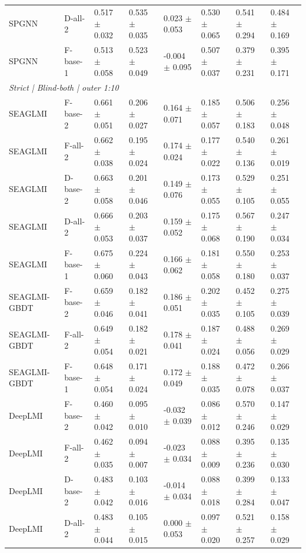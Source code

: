 \begin{landscape}
{\begin{longtable}{llllllll}
SPGNN & D-all-2 & 0.517 $\pm$ 0.032 & 0.535 $\pm$ 0.035 & 0.023 $\pm$ 0.053 & 0.530 $\pm$ 0.065 & 0.541 $\pm$ 0.294 & 0.484 $\pm$ 0.169 \\
SPGNN & F-base-1 & 0.513 $\pm$ 0.058 & 0.523 $\pm$ 0.049 & -0.004 $\pm$ 0.095 & 0.507 $\pm$ 0.037 & 0.379 $\pm$ 0.231 & 0.395 $\pm$ 0.171 \\
\multicolumn{8}{l}{\textit{Strict | Blind-both | outer 1:10}}\\
SEAGLMI & F-base-2 & 0.661 $\pm$ 0.051 & 0.206 $\pm$ 0.027 & 0.164 $\pm$ 0.071 & 0.185 $\pm$ 0.057 & 0.506 $\pm$ 0.183 & 0.256 $\pm$ 0.048 \\
SEAGLMI & F-all-2 & 0.662 $\pm$ 0.038 & 0.195 $\pm$ 0.024 & 0.174 $\pm$ 0.024 & 0.177 $\pm$ 0.022 & 0.540 $\pm$ 0.136 & 0.261 $\pm$ 0.019 \\
SEAGLMI & D-base-2 & 0.663 $\pm$ 0.058 & 0.201 $\pm$ 0.046 & 0.149 $\pm$ 0.076 & 0.173 $\pm$ 0.055 & 0.529 $\pm$ 0.105 & 0.251 $\pm$ 0.055 \\
SEAGLMI & D-all-2 & 0.666 $\pm$ 0.053 & 0.203 $\pm$ 0.037 & 0.159 $\pm$ 0.052 & 0.175 $\pm$ 0.068 & 0.567 $\pm$ 0.190 & 0.247 $\pm$ 0.034 \\
SEAGLMI & F-base-1 & 0.675 $\pm$ 0.060 & 0.224 $\pm$ 0.043 & 0.166 $\pm$ 0.062 & 0.181 $\pm$ 0.058 & 0.550 $\pm$ 0.180 & 0.253 $\pm$ 0.037 \\
SEAGLMI-GBDT & F-base-2 & 0.659 $\pm$ 0.046 & 0.182 $\pm$ 0.041 & 0.186 $\pm$ 0.051 & 0.202 $\pm$ 0.035 & 0.452 $\pm$ 0.105 & 0.275 $\pm$ 0.039 \\
SEAGLMI-GBDT & F-all-2 & 0.649 $\pm$ 0.054 & 0.182 $\pm$ 0.021 & 0.178 $\pm$ 0.041 & 0.187 $\pm$ 0.024 & 0.488 $\pm$ 0.056 & 0.269 $\pm$ 0.029 \\
SEAGLMI-GBDT & F-base-1 & 0.648 $\pm$ 0.054 & 0.171 $\pm$ 0.024 & 0.172 $\pm$ 0.049 & 0.188 $\pm$ 0.035 & 0.472 $\pm$ 0.078 & 0.266 $\pm$ 0.037 \\
DeepLMI & F-base-2 & 0.460 $\pm$ 0.042 & 0.095 $\pm$ 0.010 & -0.032 $\pm$ 0.039 & 0.086 $\pm$ 0.012 & 0.570 $\pm$ 0.246 & 0.147 $\pm$ 0.029 \\
DeepLMI & F-all-2 & 0.462 $\pm$ 0.035 & 0.094 $\pm$ 0.007 & -0.023 $\pm$ 0.034 & 0.088 $\pm$ 0.009 & 0.395 $\pm$ 0.236 & 0.135 $\pm$ 0.030 \\
DeepLMI & D-base-2 & 0.483 $\pm$ 0.042 & 0.103 $\pm$ 0.016 & -0.014 $\pm$ 0.034 & 0.088 $\pm$ 0.018 & 0.399 $\pm$ 0.284 & 0.133 $\pm$ 0.047 \\
DeepLMI & D-all-2 & 0.483 $\pm$ 0.044 & 0.105 $\pm$ 0.015 & 0.000 $\pm$ 0.053 & 0.097 $\pm$ 0.020 & 0.521 $\pm$ 0.257 & 0.158 $\pm$ 0.029 \\

\end{longtable}}
\end{landscape}
